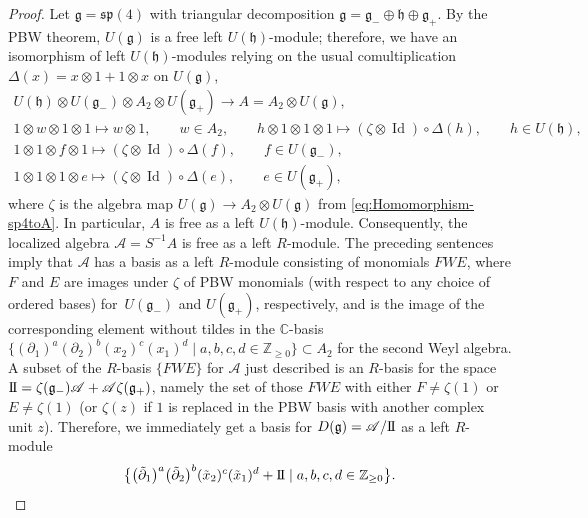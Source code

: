 \documentclass[10pt,a4paper]{amsart}
\numberwithin{equation}{section}
\DeclareMathOperator{\Id}{Id}
\newcommand{\II}{\mathrm{I\hspace{-.1em}I}}
\begin{document}
\begin{proof}
	Let $\mathfrak{g}=\mathfrak{sp}(4)$ with triangular decomposition $\mathfrak{g}=\mathfrak{g}_-\oplus\mathfrak{h}\oplus \mathfrak{g}_+$.
	By the PBW theorem, $U(\mathfrak{g})$ is a free left $U(\mathfrak{h})$-module;
	therefore,
	we have an isomorphism of left $U(\mathfrak{h})$-modules relying on the usual comultiplication $\Delta(x) = x \otimes 1 + 1\otimes x$ on $U(\mathfrak{g})$,
	\begin{gather*}
		U(\mathfrak{h})\otimes U(\mathfrak{g}_-)\otimes A_{2} \otimes U(\mathfrak{g}_+) \to A = A_2\otimes U(\mathfrak{g}), \\
		1\otimes w \otimes 1 \otimes 1 \mapsto w\otimes 1,\qquad w\in A_2,\qquad
		h\otimes 1\otimes 1\otimes 1 \mapsto (\zeta\otimes \Id)\circ\Delta(h),\qquad h\in U(\mathfrak{h}),\\
		1\otimes 1\otimes f\otimes 1 \mapsto (\zeta\otimes \Id)\circ\Delta(f),\qquad f\in U(\mathfrak{g}_-),\\
		1\otimes 1\otimes 1\otimes e \mapsto (\zeta\otimes \Id)\circ\Delta(e),\qquad e\in U(\mathfrak{g}_+),
	\end{gather*}
	where $\zeta$ is the algebra map $U(\mathfrak{g})\to A_2\otimes U(\mathfrak{g})$ from \eqref{eq:Homomorphism-sp4toA}.
	In particular, $A$ is free as a left $U(\mathfrak{h})$-module. Consequently, the localized algebra $\mathscr{A}=S^{-1}A$ is free as a left $R$-module.
	The preceding sentences imply that $\mathscr{A}$ has a basis as a left $R$-module consisting of monomials $FWE$,
	where $F$ and $E$ are images under $\zeta$ of PBW monomials (with respect to any choice of ordered bases) for~$U(\mathfrak{g}_-)$ and $U(\mathfrak{g}_+)$, respectively, and  is the image of the corresponding element without tildes in the $\mathbb{C}$-basis $\bigl\{(\partial_{1})^a(\partial_{2})^b (x_{2})^c(x_{1})^d
	\mid a,b,c,d \in \mathbb{Z}_{\geq 0} \bigr\} \subset A_{2}$ for the second Weyl algebra.
	A subset of the $R$-basis $\{FWE\}$ for $\mathscr{A}$ just described is an $R$-basis for the space $\II=\zeta(\mathfrak{g}_-)\mathscr{A}+\mathscr{A}\zeta(\mathfrak{g}_+)$, namely the set of those $FWE$ with either $F \neq \zeta(1)$ or~${E \neq \zeta(1)}$ (or $\zeta(z)$ if $1$ is replaced in the PBW basis with another complex unit $z$). Therefore, we immediately get a basis for $D(\mathfrak{g})=\mathscr{A}/\II$ as a left $R$-module
	\[%
		\bigl\{\bigl(\tilde{\partial}_{1}\bigr)^a\bigl(\tilde{\partial}_{2}\bigr)^b (\tilde{x}_{2})^c(\tilde{x}_{1})^d + \II\mid a,b,c,d\in\mathbb{Z}_{\geq 0}\bigr\}.
	\]
	

\end{proof}
\end{document}
